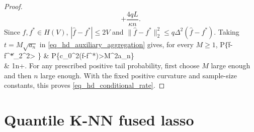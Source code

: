 \documentclass[twoside,11pt]{article}
\newenvironment{revision}{\color{revisionred}}{}
\begin{document}
\begin{proof}
\begin{revision}
\[       +\frac{4qL}{\kappa n}.
\]
Since $\hat f,f^*\in H(V)$, $|\hat f-f^*|\le2V$ and
$\|\hat f-f^*\|_2^2\le q\Delta^2(\hat f-f^*)$.
Taking $t=M\sqrt{a_n}$ in \eqref{eq_hd_auxiliary_aggregation} gives,
for every $M\ge1$,
\beq
\label{eq_hd_conditional_tail}
\mathbb P\left\{\|\hat f-f^*\|_2^2>
                    \right\}
&\,\leq\,\mathbb P\{c_0\Delta^2(\hat f-f^*)>M^2a_n\}\\
&\,\leq\,\frac1n+.
\beq
For any prescribed positive tail probability, first choose $M$
large enough and then $n$ large enough. With the fixed positive
curvature and sample-size constants, this proves
\eqref{eq_hd_conditional_rate}.
\end{revision}
\end{proof}

\section{Quantile K-NN fused lasso}
\end{document}
